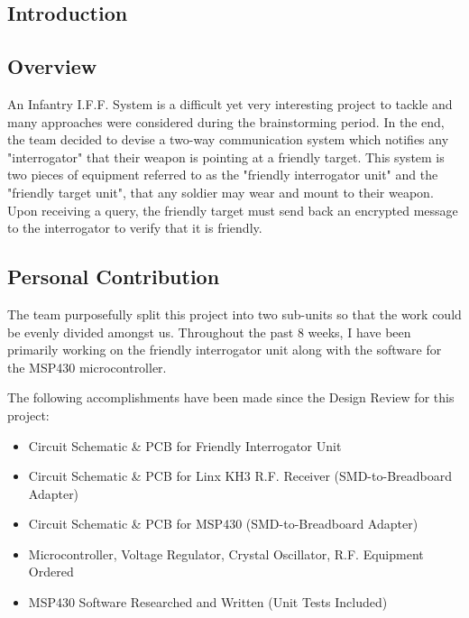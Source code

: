 \documentclass[letterpaper,10pt]{article}
\newcommand{\buildtoc}{
	\clearpage
	\singlespacing
	\tableofcontents
	\onehalfspacing
}
\begin{document}
\begin{spacing}{1.15}


\color{black}
\buildtoc
{}
\clearpage
\setcounter{page}{1}

\section{Introduction}
\subsection{Overview}
An Infantry I.F.F. System is a difficult yet very interesting project to tackle and many approaches were considered during the brainstorming period. In the end, the team decided to devise a two-way communication system which notifies any "interrogator" that their weapon is pointing at a friendly target. This system is two pieces of equipment referred to as the "friendly interrogator unit" and the "friendly target unit", that any soldier may wear and mount to their weapon. Upon receiving a query, the friendly target must send back an encrypted message to the interrogator to verify that it is friendly. 

\subsection{Personal Contribution}
The team purposefully split this project into two sub-units so that the work could be evenly divided amongst us. Throughout the past 8 weeks, I have been primarily working on the friendly interrogator unit along with the software for the MSP430 microcontroller. 

The following accomplishments have been made since the Design Review for this project:

\begin{itemize}
	\item Circuit Schematic \& PCB for Friendly Interrogator Unit
	\item Circuit Schematic \& PCB for Linx KH3 R.F. Receiver (SMD-to-Breadboard Adapter)
	\item Circuit Schematic \& PCB for MSP430 (SMD-to-Breadboard Adapter)
	\item Microcontroller, Voltage Regulator, Crystal Oscillator, R.F. Equipment Ordered
	\item MSP430 Software Researched and Written (Unit Tests Included)
\end{itemize}


\end{spacing}
\end{document}
